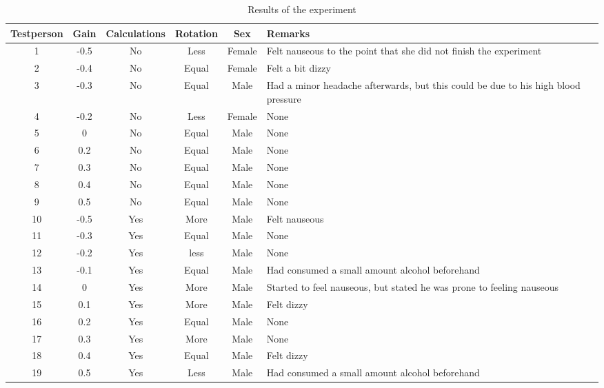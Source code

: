 \documentclass[a4paper,11pt]{article}
\begin{document}
	
\newpage
\begin{table}
\begin{center}
\begin{tabular}{|c|c|c|c|c|p{4.5cm}|}
\hline
\textbf{Testperson}	&	\textbf{Gain}	&	\textbf{Calculations}	&	\textbf{Rotation}	&	\textbf{Sex}	&	\textbf{Remarks}\\
\hline
1	&	-0.5	&	No	&	Less	&	Female	&	Felt nauseous to the point that she did not finish the experiment\\ \hline
2	&	-0.4	&	No	&	Equal	&	Female	&	Felt a bit dizzy\\ \hline
3	&	-0.3	&	No	&	Equal	&	Male	&	Had a minor headache afterwards, but this could be due to his high blood pressure\\ \hline
4	&	-0.2	&	No	&	Less	&	Female	&	None\\ \hline
5	&	0	&	No	&	Equal	&	Male	&	None\\ \hline
6	&	0.2	&	No	&	Equal	&	Male	&	None\\ \hline
7	&	0.3	&	No	&	Equal	&	Male	&	None\\ \hline
8	&	0.4	&	No	&	Equal	&	Male	&	None\\ \hline
9	&	0.5	&	No	&	Equal	&	Male	&	None\\ \hline
10	&	-0.5	&	Yes	&	More	&	Male	&	Felt nauseous\\ \hline
11	&	-0.3	&	Yes	&	Equal	&	Male	&	None\\ \hline
12	&	-0.2	&	Yes	&	less	&	Male	&	None\\ \hline
13	&	-0.1	&	Yes	&	Equal	&	Male	&	Had consumed a small amount alcohol beforehand\\ \hline
14	&	0	&	Yes	&	More	&	Male	&	Started to feel nauseous, but stated he was prone to feeling nauseous\\ \hline
15	&	0.1	&	Yes	&	More	&	Male	&	Felt dizzy\\ \hline
16	&	0.2	&	Yes	&	Equal	&	Male	&	None\\ \hline
17	&	0.3	&	Yes	&	More	&	Male	&	None\\ \hline
18	&	0.4	&	Yes	&	Equal	&	Male	&	Felt dizzy\\ \hline
19	&	0.5	&	Yes	&	Less	&	Male	&	Had consumed a small amount alcohol beforehand\\ \hline
\end{tabular}
\label{tab:experimentResults}
\caption{Results of the experiment}
\end{center}
\end{table}

	
	
	\begin{appendix}
	\label{tinyroom}
	\end{appendix}
\end{document}
